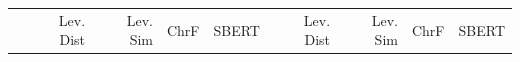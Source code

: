 \begin{table}
\begin{tabular}{lrrrrrrrr}
                                                                                                                                                                                                                                                                                                                                                                                                                                                                                                                                                                                                                                                                                                                                                                                    & Lev. Dist                               & Lev. Sim                                & ChrF   & SBERT  & Lev. Dist & Lev. Sim & ChrF   & SBERT  \\

\end{tabular}
\end{table}
